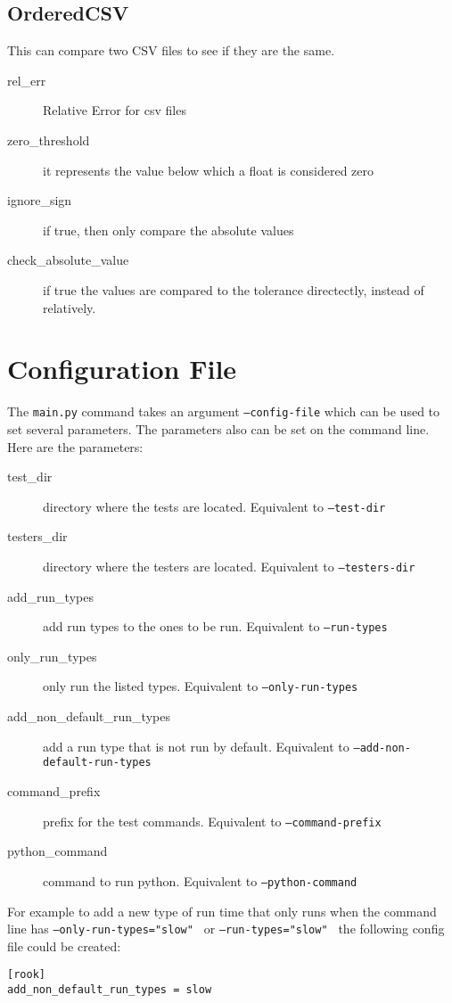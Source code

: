 \documentclass{article}
\begin{document}
\subsection{OrderedCSV}

This can compare two CSV files to see if they are the same.

\begin{description}
  \item[rel\_err] Relative Error for csv files
  \item[zero\_threshold] it represents the value below which a float is considered zero
  \item[ignore\_sign] if true, then only compare the absolute values
  \item[check\_absolute\_value] if true the values are compared to the tolerance directectly, instead of relatively.
\end{description}

\section{Configuration File}

The {\tt main.py} command takes an argument {\tt --config-file} which can be used to set several parameters.  The parameters also can be set on the command line.  Here are the parameters:

\begin{description}
\item[test\_dir] directory where the tests are located.  Equivalent to {\tt --test-dir}
\item[testers\_dir] directory where the testers are located. Equivalent to {\tt --testers-dir}
\item[add\_run\_types] add run types to the ones to be run. Equivalent to {\tt --run-types}
\item[only\_run\_types] only run the listed types. Equivalent to {\tt --only-run-types}
\item[add\_non\_default\_run\_types] add a run type that is not run by default. Equivalent to {\tt --add-non-default-run-types}
\item[command\_prefix] prefix for the test commands.  Equivalent to {\tt --command-prefix}
\item[python\_command] command to run python. Equivalent to {\tt --python-command}
\end{description}

For example to add a new type of run time that only runs when the command line has {\tt --only-run-types="slow" } or {\tt --run-types="slow" } the following config file could be created:

\begin{verbatim}
[rook]
add_non_default_run_types = slow
\end{verbatim}
\end{document}
